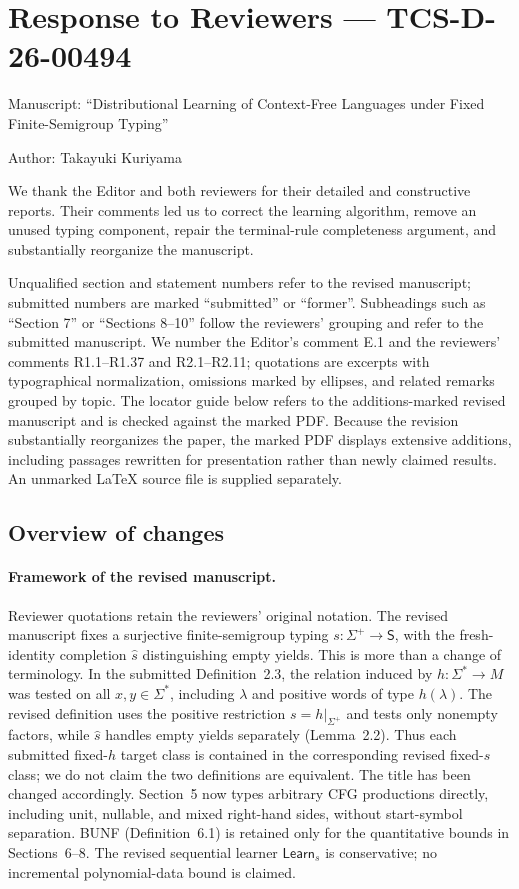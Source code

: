 \documentclass[
  10pt,
  a4paper,
]{article}
\author{}
\date{}
\begin{document}
\section{Response to Reviewers ---
TCS-D-26-00494}\label{response-to-reviewers-tcs-d-26-00494}

Manuscript: ``Distributional Learning of Context-Free Languages under
Fixed Finite-Semigroup Typing''

Author: Takayuki Kuriyama

We thank the Editor and both reviewers for their detailed and constructive reports. Their comments led us to correct the learning algorithm, remove an unused typing component, repair the terminal-rule completeness argument, and substantially reorganize the manuscript.

Unqualified section and statement numbers refer to the revised
manuscript; submitted numbers are marked ``submitted'' or ``former''.
Subheadings such as ``Section 7'' or ``Sections 8--10'' follow the
reviewers' grouping and refer to the submitted manuscript. We number the
Editor's comment E.1 and the reviewers' comments R1.1--R1.37 and
R2.1--R2.11; quotations are excerpts with typographical normalization,
omissions marked by ellipses, and related remarks grouped by topic.
The locator guide below refers to the additions-marked revised manuscript and is checked against the marked PDF. Because the revision substantially reorganizes the paper, the marked PDF displays extensive additions, including passages rewritten for presentation rather than newly claimed results. An unmarked LaTeX source file is supplied separately.

\subsection{Overview of changes}\label{overview-of-changes}

\paragraph{Framework of the revised manuscript.}
Reviewer quotations retain the reviewers' original notation.
The revised manuscript fixes a surjective finite-semigroup typing
$s:\Sigma^+\to\mathsf S$, with the fresh-identity completion
$\widehat s$ distinguishing empty yields.
This is more than a change of terminology. In the submitted
Definition~2.3, the relation induced by $h:\Sigma^*\to M$ was tested
on all $x,y\in\Sigma^*$, including $\lambda$ and positive words of
type $h(\lambda)$. The revised definition uses the positive
restriction $s=h|_{\Sigma^+}$ and tests only nonempty factors, while
$\widehat s$ handles empty yields separately (Lemma~2.2).
Thus each submitted fixed-$h$ target class is contained in the
corresponding revised fixed-$s$ class; we do not claim the two
definitions are equivalent. The title has been changed accordingly.
Section~5 now types
arbitrary CFG productions directly, including unit, nullable,
and mixed right-hand sides, without start-symbol separation.
BUNF (Definition~6.1) is retained only for the quantitative
bounds in Sections~6--8. The revised sequential learner
$\mathsf{Learn}_s$ is conservative; no incremental polynomial-data
bound is claimed.
\end{document}
